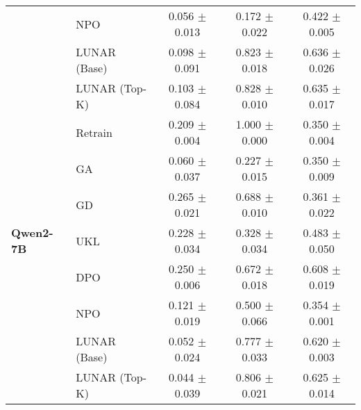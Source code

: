 \begin{table}[h]
{\begin{tabular}{@{}llccc@{}}
    & NPO & 0.056 $\pm$ 0.013 & 0.172 $\pm$ 0.022 & 0.422 $\pm$ 0.005 \\
    & LUNAR (Base)   & 0.098 $\pm$ 0.091 & 0.823 $\pm$ 0.018 & 0.636 $\pm$ 0.026\\
    & LUNAR (Top-K)  & 0.103 $\pm$ 0.084 & 0.828 $\pm$ 0.010  & 0.635 $\pm$ 0.017\\ \midrule
\multirow{7}{*}{\textbf{Qwen2-7B}} 
    & Retrain & 0.209 $\pm$ 0.004 & 1.000 $\pm$ 0.000 & 0.350  $\pm$ 0.004  \\
    & GA &  0.060 $\pm$ 0.037  & 0.227 $\pm$ 0.015 & 0.350 $\pm$ 0.009 \\
    & GD &  0.265 $\pm$  0.021  & 0.688 $\pm$ 0.010  & 0.361  $\pm$ 0.022 \\
    & UKL & 0.228  $\pm$ 0.034   & 0.328 $\pm$ 0.034 & 0.483 $\pm$ 0.050\\
    & DPO &  0.250 $\pm$ 0.006  & 0.672 $\pm$ 0.018  &  0.608   $\pm$ 0.019 \\
    & NPO & 0.121 $\pm$ 0.019 & 0.500 $\pm$ 0.066 & 0.354 $\pm$ 0.001\\
    & LUNAR (Base)   & 0.052 $\pm$ 0.024 & 0.777 $\pm$ 0.033 & 0.620 $\pm$ 0.003\\
    & LUNAR (Top-K)  & 0.044 $\pm$ 0.039 & 0.806 $\pm$ 0.021  & 0.625 $\pm$ 0.014 \\ \bottomrule
\end{tabular}
\label{tab:seq}
}
\end{table}